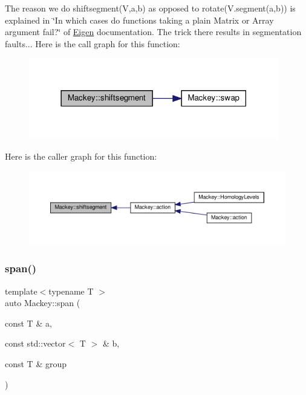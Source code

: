 The reason we do shiftsegment(\+V,a,b) as opposed to rotate(V.\+segment(a,b)) is explained in \char`\"{}\+In which cases do functions taking a plain Matrix or Array argument fail?\char`\"{} of \hyperlink{namespaceEigen}{Eigen} documentation. The trick there results in segmentation faults... Here is the call graph for this function\+:\nopagebreak
\begin{figure}[H]
\begin{center}
\leavevmode
\includegraphics[width=309pt]{namespaceMackey_aab8a6292210a3b71960cb03b79d218e6_cgraph}
\end{center}
\end{figure}
Here is the caller graph for this function\+:\nopagebreak
\begin{figure}[H]
\begin{center}
\leavevmode
\includegraphics[width=350pt]{namespaceMackey_aab8a6292210a3b71960cb03b79d218e6_icgraph}
\end{center}
\end{figure}
\mbox{\label{namespaceMackey_a1b3e66989e89c8b97d113d8eec0b47b8}} 
\subsubsection{\texorpdfstring{span()}{span()}}
{\footnotesize\ttfamily template$<$typename T $>$ \\
auto Mackey\+::span (\begin{DoxyParamCaption}\item[{const T \&}]{a,  }\item[{const std\+::vector$<$ T $>$ \&}]{b,  }\item[{const T \&}]{group }\end{DoxyParamCaption})}



